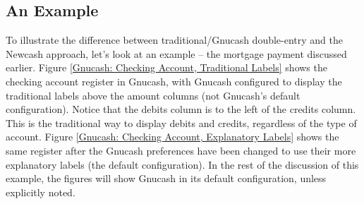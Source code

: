 \documentclass{report}
\begin{document}
\subsection{An Example}
To illustrate the difference between traditional/Gnucash double-entry and the Newcash approach, let's look at an example -- the mortgage payment discussed earlier. Figure \ref{Gnucash: Checking Account, Traditional Labels} shows the checking account register in Gnucash, with Gnucash configured to display the traditional labels above the amount columns (not Gnucash's default configuration). Notice that the debits column is to the left of the credits column. This is the traditional way to display debits and credits, regardless of the type of account.
Figure \ref{Gnucash: Checking Account, Explanatory Labels} shows the same register after the Gnucash preferences have been changed to use their more explanatory labels (the default configuration). In the rest of the discussion of this example, the figures will show Gnucash in its default configuration, unless explicitly noted.
\end{document}
